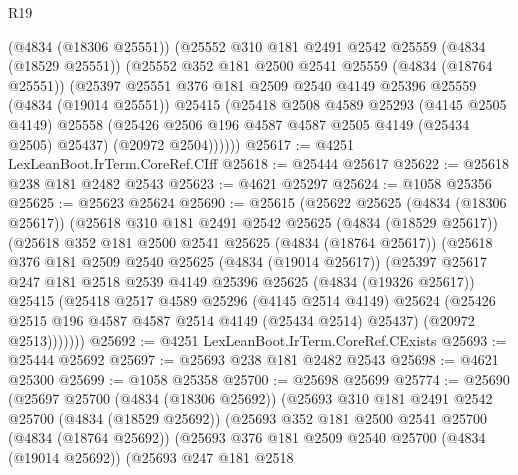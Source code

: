 \begin{lexlean}{R19}
\begin{coremodule}
      (@4834 (@18306 @25551))
      (@25552
        @310
        @181
        @2491
        @2542
        @25559
        (@4834 (@18529 @25551))
        (@25552
          @352
          @181
          @2500
          @2541
          @25559
          (@4834 (@18764 @25551))
          (@25397
            @25551
            @376
            @181
            @2509
            @2540
            @4149
            @25396
            @25559
            (@4834 (@19014 @25551))
            @25415
            (@25418
              @2508
              @4589
              @25293
              (@4145 @2505 @4149)
              @25558
              (@25426 @2506 @196 @4587 @4587 @2505 @4149 (@25434 @2505) @25437)
              (@20972 @2504))))))
@25617 := @4251 LexLeanBoot.IrTerm.CoreRef.CIff
@25618 := @25444 @25617
@25622 := @25618 @238 @181 @2482 @2543
@25623 := @4621 @25297
@25624 := @1058 @25356
@25625 := @25623 @25624
@25690 := @25615
    (@25622
      @25625
      (@4834 (@18306 @25617))
      (@25618
        @310
        @181
        @2491
        @2542
        @25625
        (@4834 (@18529 @25617))
        (@25618
          @352
          @181
          @2500
          @2541
          @25625
          (@4834 (@18764 @25617))
          (@25618
            @376
            @181
            @2509
            @2540
            @25625
            (@4834 (@19014 @25617))
            (@25397
              @25617
              @247
              @181
              @2518
              @2539
              @4149
              @25396
              @25625
              (@4834 (@19326 @25617))
              @25415
              (@25418
                @2517
                @4589
                @25296
                (@4145 @2514 @4149)
                @25624
                (@25426 @2515 @196 @4587 @4587 @2514 @4149 (@25434 @2514) @25437)
                (@20972 @2513)))))))
@25692 := @4251 LexLeanBoot.IrTerm.CoreRef.CExists
@25693 := @25444 @25692
@25697 := @25693 @238 @181 @2482 @2543
@25698 := @4621 @25300
@25699 := @1058 @25358
@25700 := @25698 @25699
@25774 := @25690
    (@25697
      @25700
      (@4834 (@18306 @25692))
      (@25693
        @310
        @181
        @2491
        @2542
        @25700
        (@4834 (@18529 @25692))
        (@25693
          @352
          @181
          @2500
          @2541
          @25700
          (@4834 (@18764 @25692))
          (@25693
            @376
            @181
            @2509
            @2540
            @25700
            (@4834 (@19014 @25692))
            (@25693
              @247
              @181
              @2518

\end{coremodule}
\end{lexlean}
